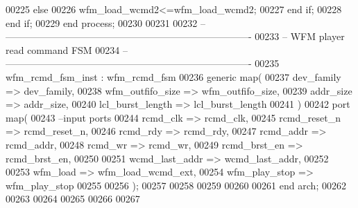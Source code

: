 \begin{DoxyCode}
00225         \textcolor{keywordflow}{else}
00226             \textcolor{vhdlchar}{wfm_load_wcmd2}\textcolor{vhdlchar}{<=}\textcolor{vhdlchar}{wfm_load_wcmd2}; 
00227         \textcolor{keywordflow}{end} \textcolor{keywordflow}{if}; 
00228     \textcolor{keywordflow}{end} \textcolor{keywordflow}{if}; 
00229 \textcolor{keywordflow}{end} \textcolor{keywordflow}{process};
00230 
00231 
00232 \textcolor{keyword}{-- ----------------------------------------------------------------------------}
00233 \textcolor{keyword}{-- WFM player read command FSM}
00234 \textcolor{keyword}{-- ----------------------------------------------------------------------------}
00235 wfm_rcmd_fsm_inst : wfm_rcmd_fsm 
00236     \textcolor{keywordflow}{generic} \textcolor{keywordflow}{map}(
00237             dev_family          => dev_family,
00238             wfm_outfifo_size    => wfm_outfifo_size,
00239             addr_size           => addr_size,
00240             lcl_burst_length    => lcl_burst_length
00241 \textcolor{vhdlchar}{)}
00242   \textcolor{keywordflow}{port} \textcolor{keywordflow}{map}(
00243 \textcolor{keyword}{      --input ports }
00244         rcmd_clk                    => rcmd_clk,
00245         rcmd_reset_n            => rcmd_reset_n,
00246         rcmd_rdy                    => rcmd_rdy,
00247         rcmd_addr               => rcmd_addr,
00248         rcmd_wr                 => rcmd_wr,
00249         rcmd_brst_en            => rcmd_brst_en,
00250 
00251         wcmd_last_addr          => wcmd_last_addr,
00252  
00253         wfm_load                    => wfm_load_wcmd_ext,
00254         wfm_play_stop           => wfm_play_stop
00255         
00256         \textcolor{vhdlchar}{)};
00257 
00258 
00259 
00260   
00261 \textcolor{keywordflow}{end} \textcolor{vhdlchar}{arch};   
00262 
00263 
00264 
00265 
00266 
00267 
\end{DoxyCode}
